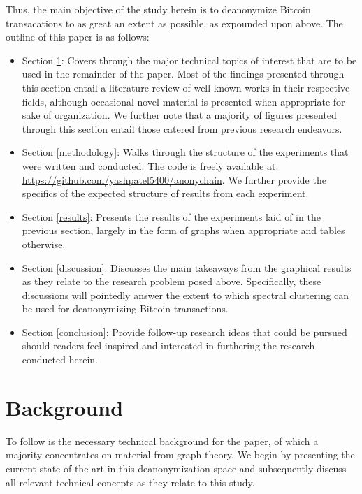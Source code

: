 \documentclass{article}
\begin{document}
Thus, the main objective of the study herein is to deanonymize Bitcoin transacations to as great an extent as possible, as expounded upon above. The outline of this paper is as follows:
\begin{itemize}
    \item Section \ref{background}: Covers through the major technical topics of interest that are to be used in the remainder of the paper. Most of the findings presented through this section entail a literature review of well-known works in their respective fields, although occasional novel material is presented when appropriate for sake of organization. We further note that a majority of figures presented through this section entail those catered from previous research endeavors.
    \item Section \ref{methodology}: Walks through the structure of the experiments that were written and conducted. The code is freely available at: \url{https://github.com/yashpatel5400/anonychain}. We further provide the specifics of the expected structure of results from each experiment.
    \item Section \ref{results}: Presents the results of the experiments laid of in the previous section, largely in the form of graphs when appropriate and tables otherwise.
    \item Section \ref{discussion}: Discusses the main takeaways from the graphical results as they relate to the research problem posed above. Specifically, these discussions will pointedly answer the extent to which spectral clustering can be used for deanonymizing Bitcoin transactions.
    \item Section \ref{conclusion}: Provide follow-up research ideas that could be pursued should readers feel inspired and interested in furthering the research conducted herein.
\end{itemize}

\section{Background}\label{background}
To follow is the necessary technical background for the paper, of which a majority concentrates on material from graph theory. We begin by presenting the current state-of-the-art in this deanonymization space and subsequently discuss all relevant technical concepts as they relate to this study. 
\end{document}
